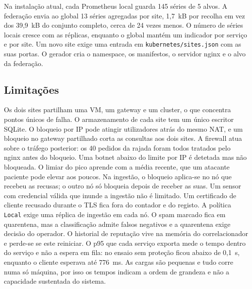 \documentclass[conference,a4paper]{IEEEtran}
\newcommand{\code}[1]{\texttt{\small #1}}
\begin{document}
Na instalação atual, cada Prometheus local guarda 145 séries de 5 alvos. A federação envia ao global 13 séries agregadas por site, 1,7~kB por recolha em vez dos 39,9~kB do conjunto completo, cerca de 24 vezes menos. O número de séries locais cresce com as réplicas, enquanto o global mantém um indicador por serviço e por site. Um novo site exige uma entrada em \code{kubernetes/sites.json} com as suas portas. O gerador cria o namespace, os manifestos, o servidor nginx e o alvo da federação.

\subsection{Limitações}
Os dois sites partilham uma VM, um gateway e um cluster, o que concentra pontos únicos de falha. O armazenamento de cada site tem um único escritor SQLite. O bloqueio por IP pode atingir utilizadores atrás do mesmo NAT, e um bloqueio no gateway partilhado corta as consultas aos dois sites. A firewall atua sobre o tráfego posterior: os 40 pedidos da rajada foram todos tratados pelo nginx antes do bloqueio. Uma botnet abaixo do limite por IP é detetada mas não bloqueada. O limiar do pico aprende com a média recente, que um atacante paciente pode elevar aos poucos. Na ingestão, o bloqueio aplica-se no nó que recebeu as recusas; o outro nó só bloqueia depois de receber as suas. Um sensor com credencial válida que inunde a ingestão não é limitado. Um certificado de cliente recusado durante o TLS fica fora do contador e do registo. A política \code{Local} exige uma réplica de ingestão em cada nó. O spam marcado fica em quarentena, mas a classificação admite falsos negativos e a quarentena exige decisão do operador. O historial de reputação vive na memória do correlacionador e perde-se se este reiniciar. O p95 que cada serviço exporta mede o tempo dentro do serviço e não a espera em fila: no ensaio sem proteção ficou abaixo de 0,1~s, enquanto o cliente esperava até 776~ms. As cargas são pequenas e tudo corre numa só máquina, por isso os tempos indicam a ordem de grandeza e não a capacidade sustentada do sistema.
\end{document}

